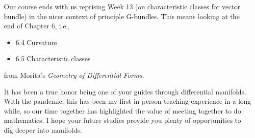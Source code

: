 \documentclass{homework}
\author{Jim Fowler}
\date{Week 16: Curvature}
\begin{document}
\maketitle

Our course ends with us reprising Week 13 (on characteristic classes
for vector bundle) in the nicer context of principle G-bundles.  This
means looking at the end of Chapter 6, i.e.,
\begin{itemize}
\item 6.4 Curvature
\item 6.5 Characteristic classes
\end{itemize}
from Morita's \textit{Geometry of Differential Forms}.

It has been a true honor being one of your guides through differential
manifolds.  With the pandemic, this has been my first in-person
teaching experience in a long while, so our time together has
highlighted the value of meeting together to do mathematics.  I hope
your future studies provide you plenty of opportunities to dig deeper
into manifolds.
\end{document}
